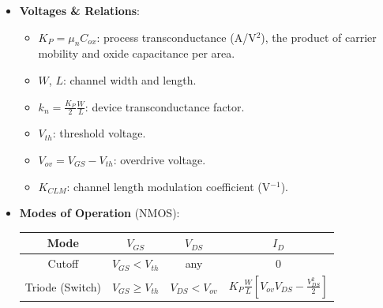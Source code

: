 \begin{itemize}
\begin{itemize}
            \(g_m \gg \omega C_{gd}\):
            \begin{align*}
              I_g &= s(C_{gs} + C_{gd}) V_{gs} \\
              I_d &= g_m V_{gs} - s C_{gd} V_{gs} \approx g_m V_{gs} \\
              \frac{I_d}{I_g} &= \frac{g_m}{s(C_{gs} + C_{gd})} \\
              \left|\frac{I_d}{I_g}\right|_{s = j 2\pi f_T} &= \frac{g_m}{2\pi f_T (C_{gs} + C_{gd})} = 1 \\
              f_T &= \frac{g_m}{2\pi (C_{gs} + C_{gd})} \\
              f_T &\approx \frac{g_m}{2\pi \cdot \frac{2}{3} W L C_{ox}} \hspace{1cm} [C_{ov} \ll W L C_{ox}] \\
              f_T &= \frac{K_P \frac{W}{L} V_{ov}}{\frac{4\pi}{3} W L C_{ox}} \hspace{1cm} [g_m = K_P \frac{W}{L} V_{ov}] \\
              f_T &= \frac{3 K_P V_{ov}}{4\pi C_{ox} L^2}
            \end{align*}
    \end{itemize}
  \item \textbf{Voltages \& Relations}:
    \begin{itemize}
      \item \(K_P = \mu_n C_{ox}\): process transconductance (A/V\(^2\)), the
        product of carrier mobility and oxide capacitance per area.
      \item \(W\), \(L\): channel width and length.
      \item \(k_n = \frac{K_P}{2}\frac{W}{L}\): device transconductance factor.
      \item \(V_{th}\): threshold voltage.
      \item \(V_{ov} = V_{GS} - V_{th}\): overdrive voltage.
      \item \(K_{CLM}\): channel length modulation coefficient (V\(^{-1}\)).
    \end{itemize}
  \item \textbf{Modes of Operation} (NMOS):
    \begin{table}[H]
      \centering
      \begin{tabular}{|c|c|c|c|}\hline
        \textbf{Mode} & \(V_{GS}\) & \(V_{DS}\) & \(I_D\) \\ \hline
        Cutoff & \(V_{GS} < V_{th}\) & any & \(0\) \\ \hline
        Triode (Switch) & \(V_{GS} \geq V_{th}\) & \(V_{DS} < V_{ov}\) & \(K_P \frac{W}{L}\left[V_{ov} V_{DS} - \frac{V_{DS}^2}{2}\right]\) \\ \hline

\end{tabular}
\end{table}
\end{itemize}
